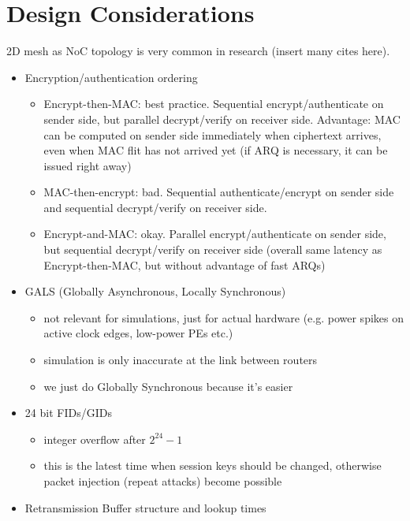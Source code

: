 \section{Design Considerations}
2D mesh as NoC topology is very common in research (insert many cites here).
\begin{itemize}
    \item Encryption/authentication ordering
        \begin{itemize}
            \item Encrypt-then-MAC: best practice. Sequential encrypt/authenticate on sender side, but parallel decrypt/verify
                on receiver side. Advantage: MAC can be computed on sender side immediately when ciphertext arrives, even when
                MAC flit has not arrived yet (if ARQ is necessary, it can be issued right away)
            \item MAC-then-encrypt: bad. Sequential authenticate/encrypt on sender side and sequential decrypt/verify on receiver
                side.
            \item Encrypt-and-MAC: okay. Parallel encrypt/authenticate on sender side, but sequential decrypt/verify on receiver
                side (overall same latency as Encrypt-then-MAC, but without advantage of fast ARQs)
        \end{itemize}
    \item GALS (Globally Asynchronous, Locally Synchronous)
        \begin{itemize}
            \item not relevant for simulations, just for actual hardware (e.g. power spikes on active clock edges, low-power PEs etc.)
            \item simulation is only inaccurate at the link between routers
            \item we just do Globally Synchronous because it's easier
        \end{itemize}
    \item 24 bit FIDs/GIDs
        \begin{itemize}
            \item integer overflow after $2^{24}-1$
            \item this is the latest time when session keys should be changed, otherwise packet injection (repeat attacks) become
                possible
        \end{itemize}
    \item Retransmission Buffer structure and lookup times
        \begin{itemize}

\end{itemize}
\end{itemize}
